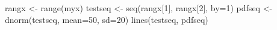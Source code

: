 \begin{Schunk}
\begin{Sinput}
 rangx <- range(myx)
 testseq <- seq(rangx[1], rangx[2], by=1)
 pdfseq <- dnorm(testseq, mean=50, sd=20)
 lines(testseq, pdfseq)
\end{Sinput}
\end{Schunk}
